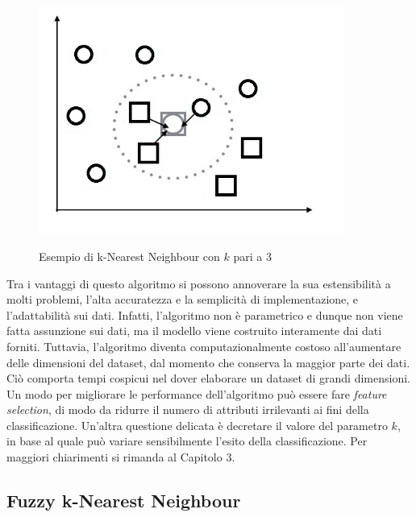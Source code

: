 \documentclass[11pt,  oneside, openany]{book}
\begin{document}
\begin{figure}[h!]
\begin{center}
  \includegraphics[width=10cm]{Immagini/KNN.png}\\
  \caption{Esempio di k-Nearest Neighbour con $k$ pari a 3}
\end{center}
\end{figure}

Tra i vantaggi di questo algoritmo si possono annoverare la sua estensibilità a molti problemi, l'alta accuratezza e la semplicità di implementazione, e l'adattabilità sui dati. Infatti, l'algoritmo non è parametrico e dunque non viene fatta assunzione sui dati, ma il modello viene costruito interamente dai dati forniti. Tuttavia, l'algoritmo diventa computazionalmente costoso all'aumentare delle dimensioni del dataset, dal momento che conserva la maggior parte dei dati. Ciò comporta tempi cospicui nel dover elaborare un dataset di grandi dimensioni. Un modo per migliorare le performance dell'algoritmo può essere fare \textit{feature selection}, di modo da ridurre il numero di attributi irrilevanti ai fini della classificazione. Un'altra questione delicata è decretare il valore del parametro $k$, in base al quale può variare sensibilmente l'esito della classificazione. Per maggiori chiarimenti si rimanda al Capitolo 3. 

\subsection{Fuzzy k-Nearest Neighbour}
\end{document}
